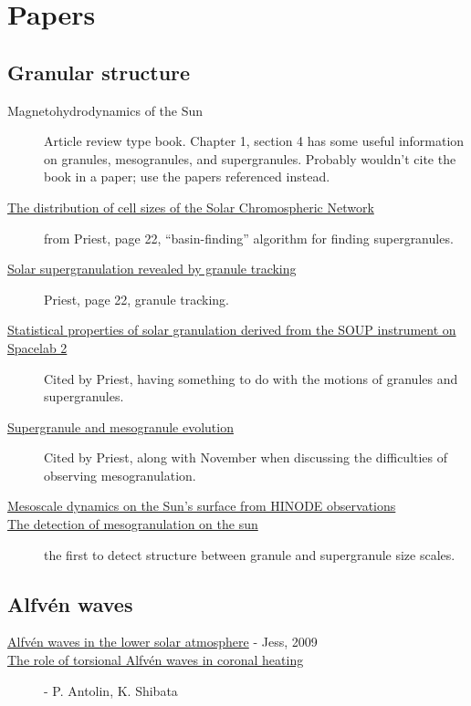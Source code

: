 \documentclass{article}
\begin{document}
\section{Papers}
\subsection{Granular structure}
\begin{description}
    \item [{Magnetohydrodynamics of the Sun}]
        Article review type book. Chapter 1, section 4 has some useful
        information on granules, mesogranules, and supergranules.
        Probably wouldn't cite the book in a paper; use the papers referenced
        instead.
    \item [\href{http://cdsads.u-strasbg.fr/abs/1997ApJ...481..988H}
        {The distribution of cell sizes of the Solar Chromospheric Network}]
        from Priest, page 22, ``basin-finding'' algorithm for finding
        supergranules.
    \item [\href{http://cdsads.u-strasbg.fr/abs/2008A\%26A...479L..17R}
        {Solar supergranulation revealed by granule tracking}]
        Priest, page 22, granule tracking.
    \item [\href{http://cdsads.u-strasbg.fr/abs/1989ApJ...336..475T}
        {Statistical properties of solar granulation derived
        from the SOUP instrument on Spacelab 2}]
        Cited by Priest, having something to do with the motions of granules and supergranules.
    \item [\href{http://cdsads.u-strasbg.fr/abs/2000SoPh..193..313S}
        {Supergranule and mesogranule evolution}]
        Cited by Priest, along with November when
        discussing the difficulties of observing mesogranulation.
    \item [\href{http://adsabs.harvard.edu/cgi-bin/bib_query?arXiv:0902.2299}
        {Mesoscale dynamics on the Sun's surface from HINODE
        observations}]
    \item [\href{http://adsabs.harvard.edu/abs/1981ApJ...245L.123N}
        {The detection of mesogranulation on the sun}]
        the first to detect structure between granule
        and supergranule size scales.
\end{description}
\subsection{Alfv\'en waves}
\begin{description}
    \item [\href{http://arxiv.org/abs/0903.3546}
        {Alfv\'en waves in the lower solar atmosphere}
        - Jess, 2009]
    \item [\href{https://arxiv.org/abs/0910.0962}
        {The role of torsional Alfv\'en waves in coronal heating}]
        - P. Antolin, K. Shibata
\end{description}
\end{document}
